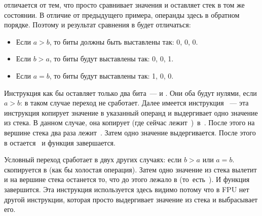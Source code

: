 


\FCOM отличается от \FCOMP тем, что просто сравнивает значения и оставляет стек в том же состоянии. 
В отличие от предыдущего примера, операнды здесь в обратном порядке. 
Поэтому и результат сравнения в \CThreeBits будет отличаться:

\begin{itemize}
\item Если $a>b$, то биты \CThreeBits должны быть выставлены так: 0, 0, 0.
\item Если $b>a$, то биты будут выставлены так: 0, 0, 1.
\item Если $a=b$, то биты будут выставлены так: 1, 0, 0.
\end{itemize}

Инструкция  как бы оставляет только два бита~--- \Cthree и \Czero. 
Они оба будут нулями, если $a>b$: в таком случае переход \JNE не сработает. 
Далее имеется инструкция ~--- эта инструкция копирует 
значение  в указанный операнд и выдергивает одно значение из стека. В данном случае, 
она копирует  
(где сейчас лежит~)~в~. 
После этого на вершине стека два раза лежит~. Затем одно значение выдергивается. 
После этого в  остается~ и функция завершается.

Условный переход \JNE сработает в двух других случаях: если $b>a$ или $a=b$. 
 скопируется в  (как бы холостая операция). 
Затем одно значение из стека вылетит и на вершине стека останется то, что 
до этого лежало в  (то~есть~). И функция завершится. 
Эта инструкция используется здесь видимо потому что в FPU 
нет другой инструкции, которая просто выдергивает 
значение из стека и выбрасывает его.


